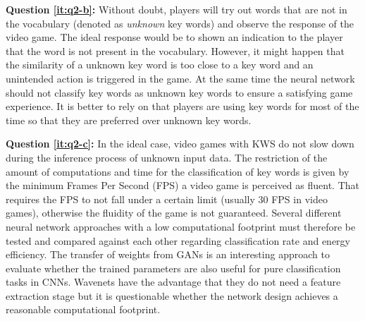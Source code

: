 \textbf{Question \ref{it:q2-b}:} 
Without doubt, players will try out words that are not in the vocabulary (denoted as \emph{unknown} key words) and observe the response of the video game.
The ideal response would be to shown an indication to the player that the word is not present in the vocabulary. 
However, it might happen that the similarity of a unknown key word is too close to a key word and an unintended action is triggered in the game. 
At the same time the neural network should not classify key words as unknown key words to ensure a satisfying game experience.
It is better to rely on that players are using key words for most of the time so that they are preferred over unknown key words.

\textbf{Question \ref{it:q2-c}:}
In the ideal case, video games with KWS do not slow down during the inference process of unknown input data.
The restriction of the amount of computations and time for the classification of key words is given by the minimum Frames Per Second (FPS) a video game is perceived as fluent.
That requires the FPS to not fall under a certain limit (usually 30 FPS in video games), otherwise the fluidity of the game is not guaranteed.
Several different neural network approaches with a low computational footprint must therefore be tested and compared against each other regarding classification rate and energy efficiency.
The transfer of weights from GANs is an interesting approach to evaluate whether the trained parameters are also useful for pure classification tasks in CNNs.
Wavenets have the advantage that they do not need a feature extraction stage but it is questionable whether the network design achieves a reasonable computational footprint.



